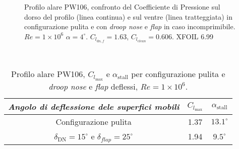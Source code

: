 \begin{figure} [H]
\centering
{}
\caption{\footnotesize Profilo alare PW106, confronto del Coefficiente di Pressione sul dorso del profilo (linea continua) e sul ventre (linea tratteggiata) in configurazione pulita e con {\itshape droop nose} e {\itshape flap} in caso incomprimibile. $Re=1\times10^6$ $\alpha =4 ^\circ$. $C_{l_{\mathrm dn, f}} = 1.63$, $C_{l_{\mathrm clean}} = 0.606$. XFOIL 6.99  }
\label{fig:dn3}
\end{figure}
\noindent \\ 
\begin{table} [!h]\centering {}
\begin{tabular}{c S c }
\toprule
\emph{Angolo di deflessione dele superfici mobili } &  $C_{l_{\mathrm{max}}}$  &  ${\alpha}_{\mathrm{stall}}$  \\ 
\midrule
Configurazione pulita & 1.37 & $13.1^\circ$   \\
$\delta_{\mathrm{DN}}=15^\circ$  e $\delta_{flap}=25 ^\circ$ & 1.94 & $9.5^\circ$  \\
\bottomrule 
\end{tabular}
\caption {Profilo alare PW106, $C_{l_{\mathrm{max}}}$ e ${\alpha}_{\mathrm{stall}}$ per configurazione pulita e {\itshape droop nose} e {\itshape flap} deflessi, $ Re=1\times10^6$.}
\label{tab:droopn1}
\end{table}
\noindent \\ \\

